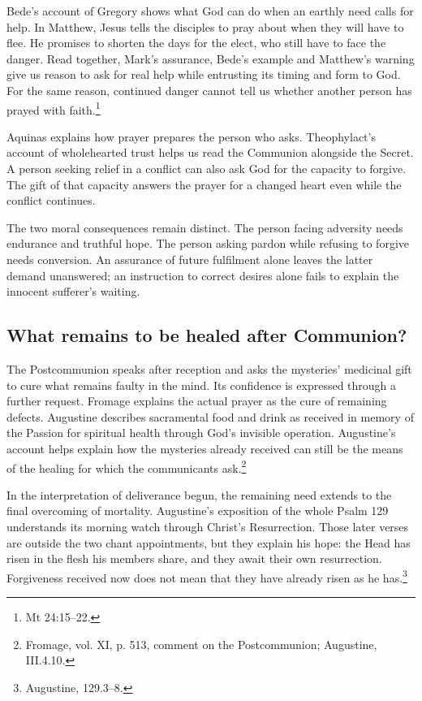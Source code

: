 Bede's account of Gregory shows what God can do when an earthly need
calls for help. In Matthew, Jesus tells the disciples to pray about when
they will have to flee. He promises to shorten the days for the elect,
who still have to face the danger. Read together, Mark's assurance,
Bede's example and Matthew's warning give us reason to ask for real help
while entrusting its timing and form to God. For the same reason,
continued danger cannot tell us whether another person has prayed with
faith.\footnote{Mt 24:15--22.}

Aquinas explains how prayer prepares the person who asks. Theophylact's
account of wholehearted trust helps us read the Communion alongside the
Secret. A person seeking relief in a conflict can also ask God for the
capacity to forgive. The gift of that capacity answers the prayer for a
changed heart even while the conflict continues.

The two moral consequences remain distinct. The person facing
adversity needs endurance and truthful hope. The person asking
pardon while refusing to forgive needs conversion. An assurance
of future fulfilment alone leaves the latter demand unanswered;
an instruction to correct desires alone fails to explain the
innocent sufferer's waiting.

\subsection{What remains to be healed after Communion?}

The Postcommunion speaks after reception and asks the mysteries'
medicinal gift to cure what remains faulty in the mind. Its confidence
is expressed through a further request. Fromage explains the actual
prayer as the cure of remaining defects. Augustine describes
sacramental food and drink as received in memory of the Passion
for spiritual health through God's invisible operation. Augustine's
account helps explain how the mysteries already received can still
be the means of the healing for which the communicants ask.\footnote{Fromage,
vol. XI, p. 513, comment on the Postcommunion; Augustine,
 III.4.10.}

In the interpretation of deliverance begun, the remaining need extends
to the final overcoming of mortality. Augustine's exposition of the
whole Psalm 129 understands its morning watch through Christ's
Resurrection. Those later verses are outside the two chant
appointments, but they explain his hope: the Head has risen in the
flesh his members share, and they await their own resurrection.
Forgiveness received now does not mean that they have already
risen as he has.\footnote{Augustine,  129.3--8.}

